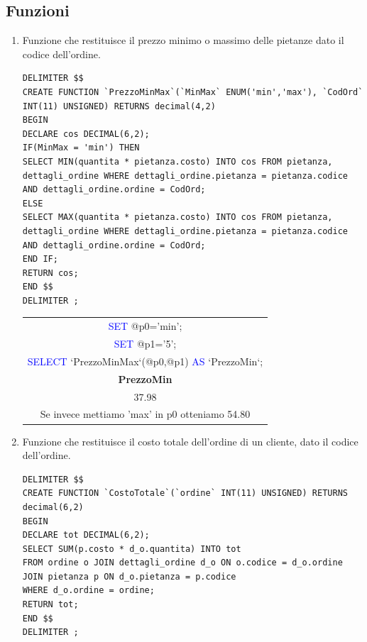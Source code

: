 \documentclass[10pt]{article}
\begin{document}
		\subsection{Funzioni}
		\begin{enumerate}[noitemsep]
		\item Funzione che restituisce il prezzo minimo o massimo delle pietanze dato il codice dell'ordine.
		\begin{lstlisting}[style=Mysql]
DELIMITER $$
CREATE FUNCTION `PrezzoMinMax`(`MinMax` ENUM('min','max'), `CodOrd` INT(11) UNSIGNED) RETURNS decimal(4,2)
BEGIN
DECLARE cos DECIMAL(6,2);
IF(MinMax = 'min') THEN
SELECT MIN(quantita * pietanza.costo) INTO cos FROM pietanza, dettagli_ordine WHERE dettagli_ordine.pietanza = pietanza.codice AND dettagli_ordine.ordine = CodOrd; 
ELSE
SELECT MAX(quantita * pietanza.costo) INTO cos FROM pietanza, dettagli_ordine WHERE dettagli_ordine.pietanza = pietanza.codice AND dettagli_ordine.ordine = CodOrd;
END IF;
RETURN cos;
END $$
DELIMITER ;
\end{lstlisting}
\begin{center}
	\begin{table}[H]
		\centering
		\label{table:fun1}
		\begin{tabular}{|c|}
			\hline
			\textcolor{blue}{SET} \textcolor{amber}{@}p0='min'; \\
			\textcolor{blue}{SET} \textcolor{amber}{@}p1='5'; \\
			\textcolor{blue}{SELECT} `PrezzoMinMax`(\textcolor{amber}{@}p0,\textcolor{amber}{@}p1) \textcolor{blue}{AS} `PrezzoMin`;
			\\ \hline
			\textbf{PrezzoMin} \\ \hline
			37.98 \\ \hline
			Se invece mettiamo 'max' in p0 otteniamo 54.80 \\ \hline
		\end{tabular}
	\end{table}
\end{center}
		\item Funzione che restituisce il costo totale dell'ordine di un cliente, dato il codice dell'ordine.
\begin{lstlisting}[style=Mysql]
DELIMITER $$
CREATE FUNCTION `CostoTotale`(`ordine` INT(11) UNSIGNED) RETURNS decimal(6,2)
BEGIN
DECLARE tot DECIMAL(6,2);
SELECT SUM(p.costo * d_o.quantita) INTO tot
FROM ordine o JOIN dettagli_ordine d_o ON o.codice = d_o.ordine JOIN pietanza p ON d_o.pietanza = p.codice
WHERE d_o.ordine = ordine;
RETURN tot;
END $$
DELIMITER ;

\end{lstlisting}
\end{enumerate}
\end{document}
